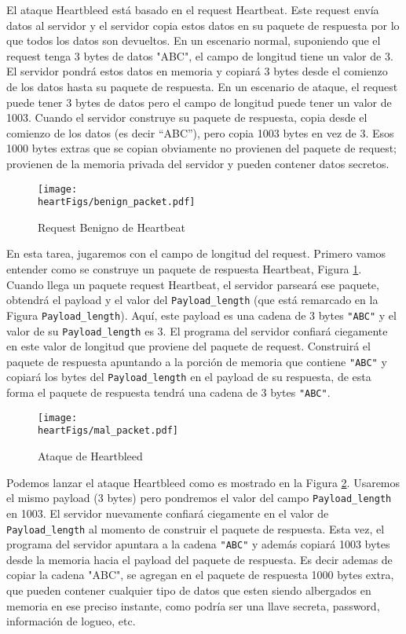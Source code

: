 El ataque Heartbleed está basado en el request Heartbeat. Este request envía datos al servidor y el servidor copia estos datos en su paquete de respuesta por lo que todos los datos son devueltos. 
En un escenario normal, suponiendo que el request tenga 3 bytes de datos "ABC", el campo de longitud tiene un valor de 3. El servidor pondrá estos datos en memoria y copiará 3 bytes desde el comienzo de los datos hasta su paquete de respuesta.
En un escenario de ataque, el request puede tener 3 bytes de datos pero el campo de longitud puede tener un valor de 1003. Cuando el servidor construye su paquete de respuesta, copia desde el comienzo de los datos (es decir ``ABC''), pero copia 1003 bytes en vez de 3.
Esos 1000 bytes extras que se copian obviamente no provienen del paquete de request; provienen de la memoria privada del servidor y pueden contener datos secretos.


\begin{figure}[htb]
\centering
\texttt{[image: \\heartFigs/benign\_packet.pdf]}
\caption{Request Benigno de Heartbeat} 
\label{fig:benign_packet}
\end{figure}

En esta tarea, jugaremos con el campo de longitud del request.
Primero vamos entender como se construye un paquete de respuesta Heartbeat, Figura \ref{fig:benign_packet}. Cuando llega un paquete request Heartbeat, el servidor parseará ese paquete, obtendrá el payload y el valor del \texttt{Payload\_length} (que está remarcado en la Figura \texttt{Payload\_length}). Aquí, este payload es una cadena de 3 bytes \texttt{"ABC"} y el valor de su \texttt{Payload\_length} es 3. El programa del servidor confiará ciegamente en este valor de longitud que proviene del paquete de request. Construirá el paquete de respuesta apuntando a la porción de memoria que contiene \texttt{"ABC"} y copiará los bytes del \texttt{Payload\_length} en el payload de su respuesta, de esta forma el paquete de respuesta tendrá una cadena de 3 bytes  \texttt{"ABC"}.

\begin{figure}[!htb]
\centering
\texttt{[image: \\heartFigs/mal\_packet.pdf]}
\caption{Ataque de Heartbleed} 
\label{fig:mal_packet}
\end{figure}

Podemos lanzar el ataque Heartbleed como es mostrado en la Figura  \ref{fig:mal_packet}. Usaremos el mismo payload (3 bytes) pero pondremos el valor del campo \texttt{Payload\_length} en 1003. El servidor nuevamente confiará ciegamente en el valor de \texttt{Payload\_length} al momento de construir el paquete de respuesta. Esta vez, el programa del servidor apuntara a la cadena \texttt{"ABC"} y además copiará 1003 bytes desde la memoria hacia el payload del  paquete de respuesta. Es decir ademas de copiar la cadena "ABC", se agregan en el paquete de respuesta 1000 bytes extra, que pueden contener cualquier tipo de datos que esten siendo albergados en memoria en ese preciso instante, como podría ser una llave secreta, password, información de logueo, etc.

